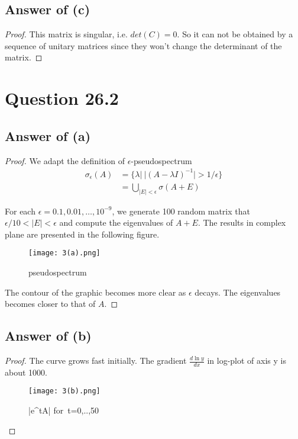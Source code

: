 \documentclass[letterpaper,11pt\iffalse ,draft\fi]{article}
\begin{document}
\subsection*{Answer of (c)}
\begin{proof}
This matrix is singular, i.e. $det(C)=0$. So it can not be obtained by a sequence of unitary matrices since they won't change the determinant of the matrix.

\end{proof}


\newpage


\section*{Question 26.2}

\subsection*{Answer of (a)}
\begin{proof}

We adapt the definition of $\epsilon$-pseudospectrum $$\begin{aligned}
\sigma_{\epsilon}(A) &= \{\lambda |\ |(A-\lambda I)^{-1}|> 1/\epsilon \} \\
&= \bigcup_{|E|<\epsilon} \sigma(A+E)
\end{aligned}$$

For each $\epsilon=0.1,0.01,\dots,10^{-9}$, we generate 100 random matrix that $\epsilon/10<|E|<\epsilon$ and compute the eigenvalues of $A+E$. The results in complex plane are presented in the following figure.

\begin{figure}[htb] \centering 
    \texttt{[image: 3(a).png]}
    \caption{pseudospectrum}
    \end{figure}
    
The contour of the graphic becomes more clear as $\epsilon$ decays. The eigenvalues becomes closer to that of $A$.\end{proof}


\subsection*{Answer of (b)}
\begin{proof}

The curve grows fast initially. The gradient $\frac {d \ln y}{d x}$ in log-plot of axis y is about 1000.

\begin{figure}[htb] \centering 
    \texttt{[image: 3(b).png]}
    \caption{|e^{tA}| for\ t=0,..,50}
    \end{figure}  \end{proof}
\end{document}
